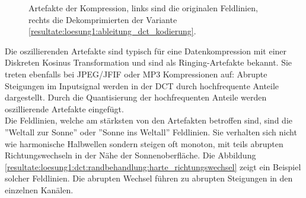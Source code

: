 \begin{figure}[!htbp]
	\center
	\caption{Artefakte der Kompression, links sind die originalen Feldlinien, rechts die Dekomprimierten der Variante \ref{resultate:loesung1:ableitung_dct_kodierung}.}
	\label{resultate:loesung1:dct:randbehandlung:jvhartefakte_loesung6}
\end{figure}
Die oszillierenden Artefakte sind typisch für eine Datenkompression mit einer Diskreten Kosinus Transformation und sind als Ringing-Artefakte \cite{wiki:ringing:artefacts} bekannt. Sie treten ebenfalls bei JPEG/JFIF oder MP3 Kompressionen auf: Abrupte Steigungen im Inputsignal werden in der DCT durch hochfrequente Anteile dargestellt. Durch die Quantisierung der hochfrequenten Anteile werden oszillierende Artefakte eingefügt.\\
Die Feldlinien, welche am stärksten von den Artefakten betroffen sind, sind die ''Weltall zur Sonne'' oder ''Sonne ins Weltall'' Feldlinien. Sie verhalten sich nicht wie harmonische Halbwellen sondern steigen oft monoton, mit teils abrupten Richtungswechseln in der Nähe der Sonnenoberfläche. Die Abbildung \ref{resultate:loesung1:dct:randbehandlung:harte_richtungswechsel} zeigt ein Beispiel solcher Feldlinien. Die abrupten Wechsel führen zu abrupten Steigungen in den einzelnen Kanälen.

